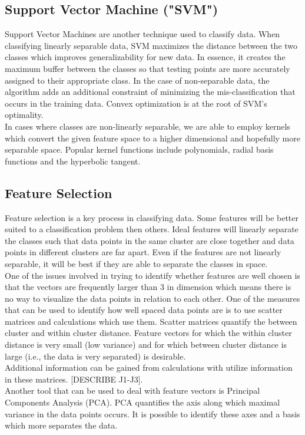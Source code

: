 \documentclass[12pt]{article}
\begin{document}
\subsection{Support Vector Machine ("SVM")}
Support Vector Machines are another technique used to classify data. When classifying linearly separable data, SVM maximizes the distance between the two classes which improves generalizability for new data. In essence, it creates the maximum buffer between the classes so that testing points are more accurately assigned to their appropriate class. In the case of non-separable data, the algorithm adds an additional constraint of minimizing the mis-classification that occurs in the training data. Convex optimization is at the root of SVM's optimality\cite{haykin2009neural}.\\
In cases where classes are non-linearly separable, we are able to employ kernels which convert the given feature space to a higher dimensional and hopefully more separable space. Popular kernel functions include polynomials, radial basis functions and the hyperbolic tangent\cite{theodoridis2009pattern}.
\subsection{Feature Selection}
Feature selection is a key process in classifying data. Some features will be better suited to a classification problem then others. Ideal features will linearly separate the classes such that data points in the same cluster are close together and data points in different clusters are far apart. Even if the features are not linearly separable, it will be best if they are able to separate the classes in space.\\
One of the issues involved in trying to identify whether features are well chosen is that the vectors are frequently larger than 3 in dimension which means there is no way to visualize the data points in relation to each other. One of the measures that can be used to identify how well spaced data points are is to use scatter matrices and calculations which use them. Scatter matrices quantify the between cluster and within cluster distance. Feature vectors for which the within cluster distance is very small (low variance) and for which between cluster distance is large (i.e., the data is very separated) is desirable. \\
Additional information can be gained from calculations with utilize information in these matrices. [DESCRIBE J1-J3].\\
Another tool that can be used to deal with feature vectors is Principal Components Analysis (PCA). PCA quantifies the axis along which maximal variance in the data points occurs. It is possible to identify these axes and a basis which more separates the data. 
\end{document}
